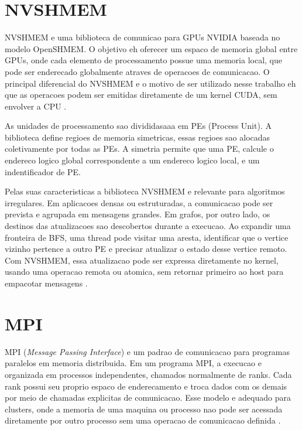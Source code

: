 \section{NVSHMEM}
NVSHMEM e uma biblioteca de comunicao para GPUs NVIDIA baseada no modelo OpenSHMEM. 
O objetivo eh oferecer um espaco de memoria global entre GPUs, onde cada elemento de 
processamento possue uma memoria local, que pode ser enderecado globalmente atraves de
operacoes de comunicacao. O principal diferencial do NVSHMEM e o motivo de ser utilizado
nesse trabalho eh que as operacoes podem ser emitidas diretamente de um kernel CUDA,
sem envolver a CPU \cite{hsunvshmem}.

As unidades de processamento sao divididasaaa em PEs (Process Unit). A biblioteca define
regioes de memoria simetricas, essas regioes sao alocadas coletivamente por todas as PEs.
A simetria permite que uma PE, calcule o endereco logico global correspondente a um
endereco logico local, e um indentificador de PE. 

Pelas suas caracteristicas a biblioteca NVSHMEM e relevante para algoritmos irregulares.
Em aplicacoes densas ou estruturadas, a comunicacao pode ser prevista e agrupada
em mensagens grandes. Em grafos, por outro lado, os destinos das atualizacoes
sao descobertos durante a execucao. Ao expandir uma fronteira de BFS, uma thread
pode visitar uma aresta, identificar que o vertice vizinho pertence a outro PE e
precisar atualizar o estado desse vertice remoto. Com NVSHMEM, essa atualizacao
pode ser expressa diretamente no kernel, usando uma operacao remota ou atomica,
sem retornar primeiro ao host para empacotar mensagens \cite{hsunvshmem}.

\section{MPI}
MPI (\textit{Message Passing Interface}) e um padrao de comunicacao para
programas paralelos em memoria distribuida. Em um programa MPI, a execucao e
organizada em processos independentes, chamados normalmente de ranks. Cada rank
possui seu proprio espaco de enderecamento e troca dados com os demais por meio
de chamadas explicitas de comunicacao. Esse modelo e adequado para clusters,
onde a memoria de uma maquina ou processo nao pode ser acessada diretamente por
outro processo sem uma operacao de comunicacao definida \cite{mpistandard}.

